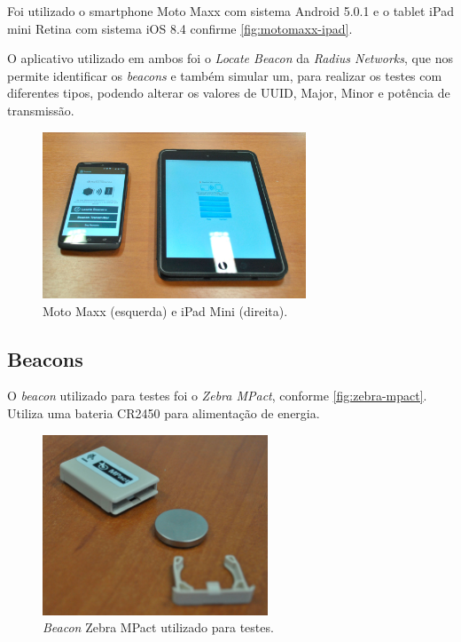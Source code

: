 Foi utilizado o smartphone Moto Maxx com sistema Android 5.0.1 e o tablet iPad mini Retina com sistema iOS 8.4 confirme \autoref{fig:motomaxx-ipad}. 

O aplicativo utilizado em ambos foi o \textit{Locate Beacon} da \textit{Radius Networks}, que nos permite identificar os \textit{beacons} e também simular um, para realizar os testes com diferentes tipos, podendo alterar os valores de UUID, Major, Minor e potência de transmissão. 

\begin{figure}[htb]
	\caption{\label{fig:motomaxx-ipad}Moto Maxx (esquerda) e iPad Mini (direita).}
	\begin{center}
		\includegraphics[width=0.7\textwidth]{img/motomaxx-ipad.jpg}
	\end{center}
\end{figure}

\subsection{Beacons}\label{sec:beacons-modo}

O \textit{beacon} utilizado para testes foi o \textit{Zebra MPact}, conforme \autoref{fig:zebra-mpact}. Utiliza uma bateria CR2450 para alimentação de energia. 

\begin{figure}[htb]
	\caption{\label{fig:zebra-mpact}\textit{Beacon} Zebra MPact utilizado para testes.}
	\begin{center}
		\includegraphics[width=0.6\textwidth]{img/beacon-mpact2.jpg}
	\end{center}
\end{figure}

